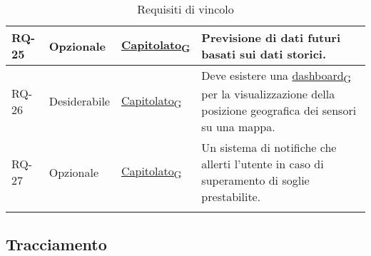 \begin{longtable}{|>{\centering\arraybackslash}m{}|>{\centering\arraybackslash}m{}|>{\centering\arraybackslash}m{}|>{\centering\arraybackslash}m{}|}
	RQ-25           & Opzionale           & \href{https://7last.github.io/docs/rtb/documentazione-interna/glossario#capitolato}{Capitolato\textsubscript{G}}     & Previsione di dati futuri basati sui dati storici.                                                      \\\hline
	RQ-26           & Desiderabile        & \href{https://7last.github.io/docs/rtb/documentazione-interna/glossario#capitolato}{Capitolato\textsubscript{G}}     & Deve esistere una \href{https://7last.github.io/docs/rtb/documentazione-interna/glossario#dashboard}{dashboard\textsubscript{G}} per la visualizzazione della posizione geografica dei sensori su una mappa. \\\hline
	RQ-27           & Opzionale           & \href{https://7last.github.io/docs/rtb/documentazione-interna/glossario#capitolato}{Capitolato\textsubscript{G}}     & Un sistema di notifiche che allerti l'utente in caso di superamento di soglie prestabilite.             \\\hline
	\caption{Requisiti di vincolo}
	\label{table:3}
\end{longtable}


\subsection{Tracciamento}
